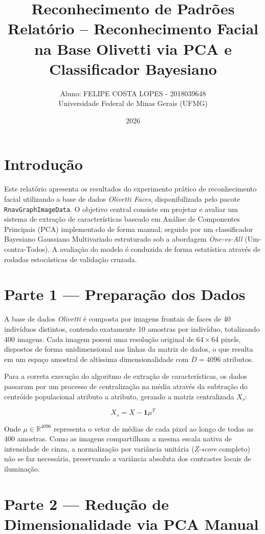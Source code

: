 \documentclass[12pt]{article}
\title{Reconhecimento de Padrões \\ Relatório -- Reconhecimento Facial na Base Olivetti via PCA e Classificador Bayesiano}
\author{Aluno: FELIPE COSTA LOPES - 2018039648 \\ Universidade Federal de Minas Gerais (UFMG)}
\date{2026}
\begin{document}
\maketitle

\section*{Introdução}

Este relatório apresenta os resultados do experimento prático de reconhecimento facial utilizando a base de dados \textit{Olivetti Faces}, disponibilizada pelo pacote \texttt{RnavGraphImageData}. O objetivo central consiste em projetar e avaliar um sistema de extração de características baseado em Análise de Componentes Principais (PCA) implementado de forma manual, seguido por um classificador Bayesiano Gaussiano Multivariado estruturado sob a abordagem \textit{One-vs-All} (Um-contra-Todos). A avaliação do modelo é conduzida de forma estatística através de rodadas estocásticas de validação cruzada.

\section{Parte 1 — Preparação dos Dados}

A base de dados \textit{Olivetti} é composta por imagens frontais de faces de 40 indivíduos distintos, contendo exatamente 10 amostras por indivíduo, totalizando 400 imagens. Cada imagem possui uma resolução original de $64 \times 64$ pixels, dispostos de forma unidimensional nas linhas da matriz de dados, o que resulta em um espaço amostral de altíssima dimensionalidade com $D = 4096$ atributos.

Para a correta execução do algoritmo de extração de características, os dados passaram por um processo de centralização na média através da subtração do centróide populacional atributo a atributo, gerando a matriz centralizada $X_s$:

$$X_s = X - \mathbf{1}\mu^T$$

Onde $\mu \in \mathbb{R}^{4096}$ representa o vetor de médias de cada pixel ao longo de todas as 400 amostras. Como as imagens compartilham a mesma escala nativa de intensidade de cinza, a normalização por variância unitária (\textit{Z-score} completo) não se faz necessária, preservando a variância absoluta dos contrastes locais de iluminação.

\section{Parte 2 — Redução de Dimensionalidade via PCA Manual}
\end{document}
